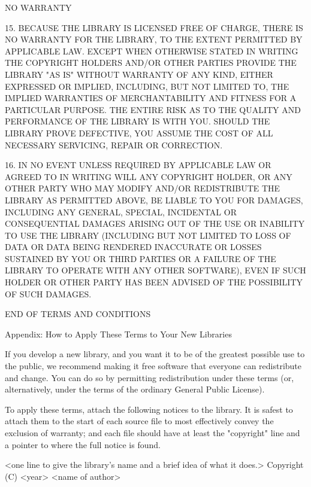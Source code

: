 \documentclass[twoside]{tceusermanual}
\begin{document}
\begin{center}
NO WARRANTY
\end{center}

  15. BECAUSE THE LIBRARY IS LICENSED FREE OF CHARGE, THERE IS NO
WARRANTY FOR THE LIBRARY, TO THE EXTENT PERMITTED BY APPLICABLE LAW.
EXCEPT WHEN OTHERWISE STATED IN WRITING THE COPYRIGHT HOLDERS AND/OR
OTHER PARTIES PROVIDE THE LIBRARY "AS IS" WITHOUT WARRANTY OF ANY KIND,
EITHER EXPRESSED OR IMPLIED, INCLUDING, BUT NOT LIMITED TO, THE
IMPLIED WARRANTIES OF MERCHANTABILITY AND FITNESS FOR A PARTICULAR
PURPOSE.  THE ENTIRE RISK AS TO THE QUALITY AND PERFORMANCE OF THE
LIBRARY IS WITH YOU.  SHOULD THE LIBRARY PROVE DEFECTIVE, YOU ASSUME
THE COST OF ALL NECESSARY SERVICING, REPAIR OR CORRECTION.

  16. IN NO EVENT UNLESS REQUIRED BY APPLICABLE LAW OR AGREED TO IN
WRITING WILL ANY COPYRIGHT HOLDER, OR ANY OTHER PARTY WHO MAY MODIFY
AND/OR REDISTRIBUTE THE LIBRARY AS PERMITTED ABOVE, BE LIABLE TO YOU
FOR DAMAGES, INCLUDING ANY GENERAL, SPECIAL, INCIDENTAL OR CONSEQUENTIAL
DAMAGES ARISING OUT OF THE USE OR INABILITY TO USE THE
LIBRARY (INCLUDING BUT NOT LIMITED TO LOSS OF DATA OR DATA BEING
RENDERED INACCURATE OR LOSSES SUSTAINED BY YOU OR THIRD PARTIES OR A
FAILURE OF THE LIBRARY TO OPERATE WITH ANY OTHER SOFTWARE), EVEN IF
SUCH HOLDER OR OTHER PARTY HAS BEEN ADVISED OF THE POSSIBILITY OF SUCH DAMAGES.

\begin{center}
END OF TERMS AND CONDITIONS
\end{center}

\begin{center}
Appendix: How to Apply These Terms to Your New Libraries
\end{center}

If you develop a new library, and you want it to be of the
greatest possible use to the public, we recommend making it free
software that everyone can redistribute and change.  You can do
so by permitting redistribution under these terms (or,
alternatively, under the terms of the ordinary General Public
License).

To apply these terms, attach the following notices to the
library.  It is safest to attach them to the start of each
source file to most effectively convey the exclusion of
warranty; and each file should have at least the "copyright"
line and a pointer to where the full notice is found.

    <one line to give the library's name and a brief idea of what it does.>
    Copyright (C) <year>  <name of author>
\end{document}
